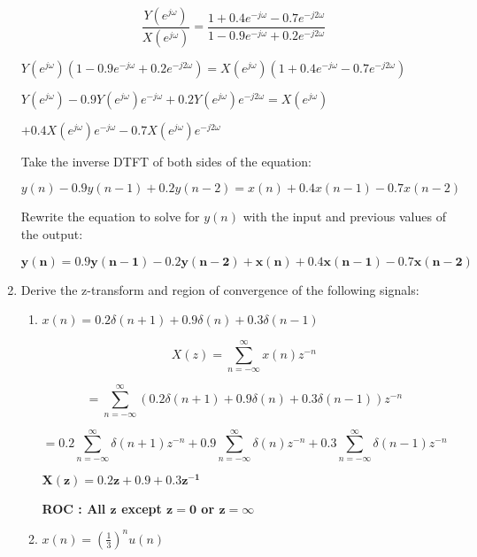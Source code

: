 \documentclass[fleqn]{article}
\begin{document}
\begin{enumerate}[nolistsep]
			\begin{equation*}
				\frac{Y(e^{j\omega})}{X(e^{j\omega})} = \frac{1 + 0.4e^{-j\omega} - 0.7e^{-j2\omega}}{1 - 0.9e^{-j\omega} + 0.2e^{-j2\omega}}
			\end{equation*}
			
			$Y(e^{j\omega})(1 - 0.9e^{-j\omega} + 0.2e^{-j2\omega}) = X(e^{j\omega})(1 + 0.4e^{-j\omega} - 0.7e^{-j2\omega})$
			
			$Y(e^{j\omega}) - 0.9Y(e^{j\omega})e^{-j\omega} + 0.2Y(e^{j\omega})e^{-j2\omega} = X(e^{j\omega})$
			
			$ + 0.4X(e^{j\omega})e^{-j\omega} - 0.7X(e^{j\omega})e^{-j2\omega}$
			
			Take the inverse DTFT of both sides of the equation:
			
			$y(n) - 0.9y(n-1) + 0.2y(n-2) = x(n) + 0.4x(n-1) - 0.7x(n-2)$
			
			Rewrite the equation to solve for $y(n)$ with the input and previous values of the output:
			
			$\mathbf{y(n) = 0.9y(n-1) - 0.2y(n-2) + x(n) + 0.4x(n-1) - 0.7x(n-2)}$
			
		\item Derive the z-transform and region of convergence of the following signals:
		
			\begin{enumerate}[nolistsep]
				\item $x(n) = 0.2\delta(n+1) + 0.9\delta(n) + 0.3\delta(n-1)$
				
					\begin{equation*}
						X(z) = \sum_{n=-\infty}^{\infty}x(n)z^{-n}
					\end{equation*}
					
					\begin{equation*}
						= \sum_{n=-\infty}^{\infty}(0.2\delta(n+1) + 0.9\delta(n) + 0.3\delta(n-1))z^{-n}
					\end{equation*}
					
					\begin{equation*}
						= 0.2\sum_{n=-\infty}^{\infty}\delta(n+1)z^{-n} + 0.9\sum_{n=-\infty}^{\infty}\delta(n)z^{-n} + 0.3\sum_{n=-\infty}^{\infty}\delta(n-1)z^{-n}
					\end{equation*}
					
					$\mathbf{X(z) = 0.2z + 0.9 + 0.3z^{-1}}$
					
					\textbf{ROC : All $\mathbf{z}$ except $\mathbf{z = 0}$ or $\mathbf{z = \infty}$}
					
				\item $x(n) = \left(\frac{1}{3}\right)^{n}u(n)$
				

\end{enumerate}
\end{enumerate}
\end{document}
